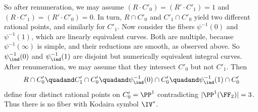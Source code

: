 So after renumeration, we may assume $(R\cdot C'_0)=(R'\cdot C'_1)=1$ and $(R\cdot C'_1)=(R'\cdot C'_0)=0$.
In turn, $R\cap C'_0$ and $C'_1\cap C'_0$ yield two different rational points, and similarly for $C'_1$.
Now consider the   fibers $\psi^{-1}(0)$ and $\psi^{-1}(1)$, which are linearly equivalent curves.
Both are multiple, because $\psi^{-1}(\infty)$ is simple, and their reductions are smooth, as   observed above.
So $\psi^{-1}_\ind(0)$ and $\psi^{-1}_\ind(1)$ are disjoint but numerically equivalent integral curves.
After renumeration, we may assume that they intersect $C'_0$ but not $C'_1$. Then
$$
R\cap C'_0\quadand C'_1\cap C'_0\quadand \psi^{-1}_\ind(0)\cap C'_0 \quadand \psi^{-1}_\ind(1)\cap C'_0
$$
define four distinct rational points on $C'_0=\PP^1$
contradicting $|\PP^1(\FF_2)|=3$.  Thus there is no fiber with Kodaira symbol $\IV^*$.

